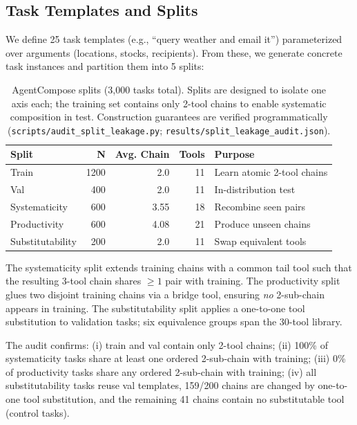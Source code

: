 \documentclass[10pt]{article}
\begin{document}
\subsection{Task Templates and Splits}

We define 25 task templates (e.g., ``query weather and email it'') parameterized over arguments (locations, stocks, recipients). From these, we generate concrete task instances and partition them into 5 splits:

\begin{table}[t]
    \centering
    \small
    \begin{tabular}{lrrrl}
        \toprule
        Split & N & Avg. Chain & Tools & Purpose \\
        \midrule
        Train & 1200 & 2.0 & 11 & Learn atomic 2-tool chains \\
        Val & 400 & 2.0 & 11 & In-distribution test \\
        Systematicity & 600 & 3.55 & 18 & Recombine seen pairs \\
        Productivity & 600 & 4.08 & 21 & Produce unseen chains \\
        Substitutability & 200 & 2.0 & 11 & Swap equivalent tools \\
        \bottomrule
    \end{tabular}
    \caption{AgentCompose splits (3{,}000 tasks total). Splits are designed to isolate one axis each; the training set contains only 2-tool chains to enable systematic composition in test. Construction guarantees are verified programmatically (\texttt{scripts/audit\_split\_leakage.py}; \texttt{results/split\_leakage\_audit.json}).}
    \label{tab:splits}
\end{table}

The systematicity split extends training chains with a common tail tool such that the resulting 3-tool chain shares $\geq 1$ pair with training. The productivity split glues two disjoint training chains via a bridge tool, ensuring \emph{no} 2-sub-chain appears in training. The substitutability split applies a one-to-one tool substitution to validation tasks; six equivalence groups span the 30-tool library.

The audit confirms: (i) train and val contain only 2-tool chains; (ii) 100\% of systematicity tasks share at least one ordered 2-sub-chain with training; (iii) 0\% of productivity tasks share any ordered 2-sub-chain with training; (iv) all substitutability tasks reuse val templates, 159/200 chains are changed by one-to-one tool substitution, and the remaining 41 chains contain no substitutable tool (control tasks).
\end{document}
